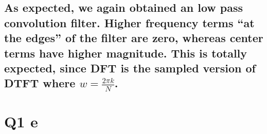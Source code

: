 \documentclass[11pt]{article}
\begin{document}
    \hypertarget{as-expected-we-again-obtained-an-low-pass-convolution-filter.-higher-frequency-terms-at-the-edges-of-the-filter-are-zero-whereas-center-terms-have-higher-magnitude.-this-is-totally-expected-since-dft-is-the-sampled-version-of-dtft-where-w-frac2pi-kn.}{%
\subsection{\texorpdfstring{As expected, we again obtained an low pass
convolution filter. Higher frequency terms ``at the edges'' of the
filter are zero, whereas center terms have higher magnitude. This is
totally expected, since DFT is the sampled version of DTFT where
\(w = \frac{2\pi k}{N}\).}{As expected, we again obtained an low pass convolution filter. Higher frequency terms ``at the edges'' of the filter are zero, whereas center terms have higher magnitude. This is totally expected, since DFT is the sampled version of DTFT where w = \textbackslash frac\{2\textbackslash pi k\}\{N\}.}}\label{as-expected-we-again-obtained-an-low-pass-convolution-filter.-higher-frequency-terms-at-the-edges-of-the-filter-are-zero-whereas-center-terms-have-higher-magnitude.-this-is-totally-expected-since-dft-is-the-sampled-version-of-dtft-where-w-frac2pi-kn.}}

    \hypertarget{q1-e}{%
\section{Q1 e}\label{q1-e}}
\end{document}
